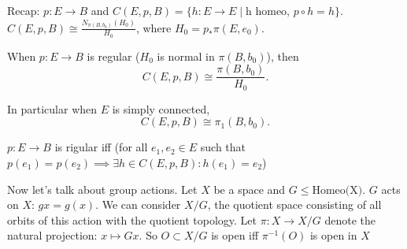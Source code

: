 
Recap: $p: E \to  B$ and $C (E, p, B) = \{ h : E \to  E  \mid  \text{h homeo, $p  \circ  h = h$}\}$.
$C(E, p, B) \cong \frac{N_{\pi(B,b_0) }(H_0)}{H_0}$, where $H_0 = p_* \pi(E,e_0) $.

When $p : E \to  B$ is regular ($H_0$ is normal in $\pi(B,b_0)$), then
\[
    C(E, p, B) \cong \frac{\pi(B,b_0) }{H_0}
.\]

In particular when $E$ is simply connected,
\[
    C(E, p, B) \cong \pi_1(B, b_0)
.\]

$p: E \to  B$ is rigular iff (for all $e_1, e_2 \in E$ such that $p(e_1) = p(e_2) \implies \exists  h \in C(E, p, B): h(e_1) = e_2$)


Now let's talk about group actions.
Let $X$ be a space and $G \le \text{Homeo(X)}$.
$G$ acts on $X$:  $g x = g(x)$.
We can consider $X / G$, the quotient space consisting of all orbits of this action with the quotient topology.
Let $\pi: X \to X / G$ denote the natural projection: $ x\mapsto  Gx$.
So $O \subset  X /G$ is open iff  $\pi^{-1}(O)$ is open in $X$

